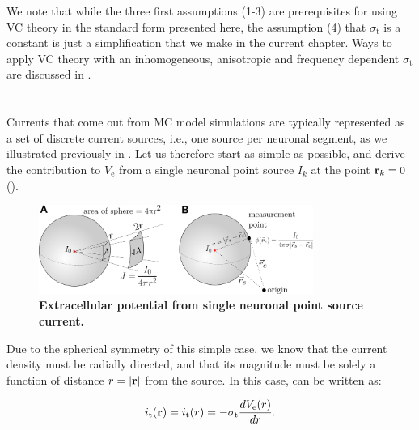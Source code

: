 We note that while the three first assumptions (1-3) are prerequisites for using VC theory in the standard form presented here, the assumption (4) that $\sigma_\mathrm{t}$ is a constant is just a simplification that we make in the current chapter. Ways to apply VC theory with an inhomogeneous, anisotropic and frequency dependent $\sigma_\mathrm{t}$ are discussed in .


\section{}
\label{sec:VC:pointsource}
Currents that come out from MC model simulations are typically represented as 
a set of discrete current sources, i.e., one source per neuronal segment, as we illustrated previously in . Let us therefore start as simple as possible, 
and derive the contribution to $V_\mathrm{e}$ from a single neuronal point source 
$I_{k}$ at the point ${\bf r}_k=0$ ().

\begin{figure}[!ht]
\begin{center}
\includegraphics[width=0.8\textwidth]{Figures/VC/EP_from_pointsource_illustration.png}
\end{center}
\caption{\textbf{Extracellular potential from single neuronal point source current.} 
}
\label{fig:VC:pointsource}
\end{figure}

Due to the spherical symmetry of this simple case, we know that the current density 
must be radially directed, and that its magnitude must be solely a function of distance $r = |{\bf r}|$ from the source.
In this case,  can be written as:

\begin{equation}
i_\mathrm{t}({\bf r}) = i_\mathrm{t}(r) = -\sigma_\mathrm{t} \frac{dV_\mathrm{e}(r)}{dr}.
\end{equation}

